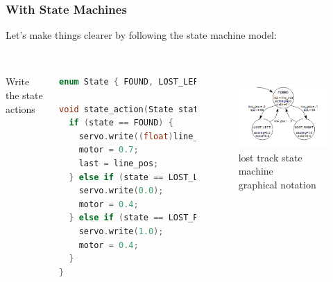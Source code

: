 \documentclass{beamer}
\begin{document}
\begin{frame}[fragile]
\frametitle{With State Machines}
Let's make things clearer by following the state machine model: \\
\hfill \\
\begin{columns}[t]
Write the state actions
\begin{lstlisting}[language=C++,basicstyle=\ttfamily\tiny]
enum State { FOUND, LOST_LEFT, LOST_RIGHT };

void state_action(State state, int16_t line_pos, int16_t& last_out) {
  if (state == FOUND) {
    servo.write((float)line_pos/CAMERA_LENGTH);
    motor = 0.7;
    last = line_pos;
  } else if (state == LOST_LEFT) {
    servo.write(0.0);
    motor = 0.4;
  } else if (state == LOST_RIGHT) {
    servo.write(1.0);
    motor = 0.4;
  }
}
\end{lstlisting}

\begin{figure}[h!]
\includegraphics[width=1.0\columnwidth]{images/statemachine} \\
lost track state machine \\
graphical notation
\end{figure}
\end{columns}
\end{frame}
\end{document}
